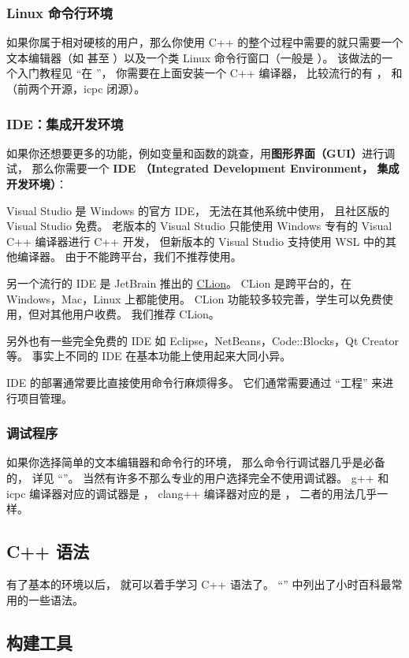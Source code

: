 \subsubsection{Linux 命令行环境}
如果你属于相对硬核的用户，那么你使用 C++ 的整个过程中需要的就只需要一个文本编辑器（如  甚至 ）以及一个类 Linux 命令行窗口（一般是 ）。 该做法的一个入门教程见 “在 ”， 你需要在上面安装一个 C++ 编译器， 比较流行的有 ，  和 （前两个开源，icpc 闭源）。

\subsubsection{IDE：集成开发环境}
如果你还想要更多的功能，例如变量和函数的跳查，用\textbf{图形界面（GUI）}进行调试， 那么你需要一个 \textbf{IDE （Integrated Development Environment， 集成开发环境）}：

Visual Studio 是 Windows 的官方 IDE， 无法在其他系统中使用， 且社区版的 Visual Studio 免费。 老版本的 Visual Studio 只能使用 Windows 专有的 Visual C++ 编译器进行 C++ 开发， 但新版本的 Visual Studio 支持使用 WSL 中的其他编译器。 由于不能跨平台，我们不推荐使用。

另一个流行的 IDE 是 JetBrain 推出的 \href{https://www.jetbrains.com/clion/}{CLion}。 CLion 是跨平台的，在 Windows，Mac，Linux 上都能使用。 CLion 功能较多较完善，学生可以免费使用，但对其他用户收费。 我们推荐 CLion。

另外也有一些完全免费的 IDE 如 Eclipse，NetBeans，Code::Blocks，Qt Creator 等。 事实上不同的 IDE 在基本功能上使用起来大同小异。

IDE 的部署通常要比直接使用命令行麻烦得多。 它们通常需要通过 “工程” 来进行项目管理。

\subsubsection{调试程序}
如果你选择简单的文本编辑器和命令行的环境， 那么命令行调试器几乎是必备的， 详见 “”。 当然有许多不那么专业的用户选择完全不使用调试器。 g++ 和 icpc 编译器对应的调试器是 ， clang++ 编译器对应的是 ， 二者的用法几乎一样。

\subsection{C++ 语法}
有了基本的环境以后， 就可以着手学习 C++ 语法了。 “” 中列出了小时百科最常用的一些语法。

\subsection{构建工具}
